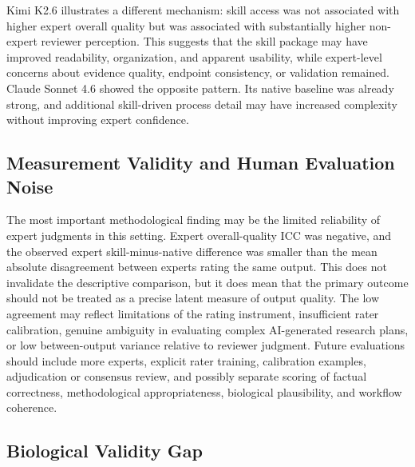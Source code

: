 \documentclass[11pt]{article}
\begin{document}
Kimi K2.6 illustrates a different mechanism: skill access was not associated with higher expert overall quality but was associated with substantially higher non-expert reviewer perception. This suggests that the skill package may have improved readability, organization, and apparent usability, while expert-level concerns about evidence quality, endpoint consistency, or validation remained. Claude Sonnet 4.6 showed the opposite pattern. Its native baseline was already strong, and additional skill-driven process detail may have increased complexity without improving expert confidence.

\subsection{Measurement Validity and Human Evaluation Noise}

The most important methodological finding may be the limited reliability of expert judgments in this setting. Expert overall-quality ICC was negative, and the observed expert skill-minus-native difference was smaller than the mean absolute disagreement between experts rating the same output. This does not invalidate the descriptive comparison, but it does mean that the primary outcome should not be treated as a precise latent measure of output quality. The low agreement may reflect limitations of the rating instrument, insufficient rater calibration, genuine ambiguity in evaluating complex AI-generated research plans, or low between-output variance relative to reviewer judgment. Future evaluations should include more experts, explicit rater training, calibration examples, adjudication or consensus review, and possibly separate scoring of factual correctness, methodological appropriateness, biological plausibility, and workflow coherence.

\subsection{Biological Validity Gap}
\end{document}
